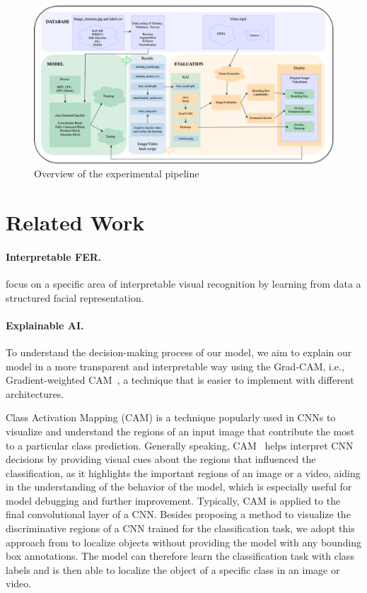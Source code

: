 \begin{figure}[ht]
  \centering
   \includegraphics[width=\linewidth]{pipeline.png}
   \caption{Overview of the experimental pipeline} 
   \label{fig:pipeline}
\end{figure}

\section{Related Work}
\label{sec:related}

\paragraph{Interpretable FER.}

\citet{YinTLS019} focus on a specific area of interpretable visual recognition by learning from data a structured facial representation. 
\citet{Malik0R21} 

\paragraph{Explainable AI.}
To understand the decision-making process of our model, 
we aim to explain our model in a more transparent and interpretable way using the Grad-CAM, 
i.e., Gradient-weighted CAM~\cite{SelvarajuCDVPB17}, 
a technique that is easier to implement with different architectures. 

Class Activation Mapping (CAM) is a technique popularly used in CNNs to visualize and understand the regions of an input image that contribute the most to a particular class prediction. 
Generally speaking, 
CAM~\cite{ZhouKLOT16} helps interpret CNN decisions by providing visual cues about the regions that influenced the classification, 
as it highlights the important regions of an image or a video, 
aiding in the understanding of the behavior of the model, 
which is especially useful for model debugging and further improvement. 
Typically,
CAM is applied to the final convolutional layer of a CNN. 
Besides proposing a method to visualize the discriminative regions of a CNN trained for the classification task, 
we adopt this approach from \citet{ZhouKLOT16} to localize objects without providing the model with any bounding box annotations. 
The model can therefore learn the classification task with class labels and is then able to localize the object of a specific class in an image or video. 

